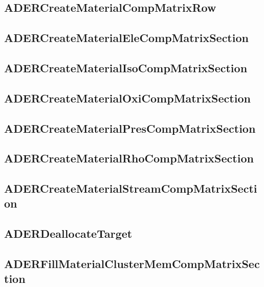 \subsection{ADERCreateMaterialCompMatrixRow}


\subsection{ADERCreateMaterialEleCompMatrixSection}


\subsection{ADERCreateMaterialIsoCompMatrixSection}


\subsection{ADERCreateMaterialOxiCompMatrixSection}


\subsection{ADERCreateMaterialPresCompMatrixSection}


\subsection{ADERCreateMaterialRhoCompMatrixSection}


\subsection{ADERCreateMaterialStreamCompMatrixSection}


\subsection{ADERDeallocateTarget}


\subsection{ADERFillMaterialClusterMemCompMatrixSection}


